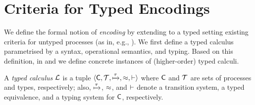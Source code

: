 \documentclass[runningheads]{llncs}
\begin{document}
{{\section{Criteria for Typed Encodings}
\label{s:expr}
%
We define the formal notion of \emph{encoding} by 
extending to a typed setting existing criteria for untyped processes (as in, e.g.,
\cite{Nestmann00,Palamidessi03,DBLP:conf/lics/PalamidessiSVV06,DBLP:journals/iandc/Gorla10,DBLP:conf/icalp/LanesePSS10,DBLP:journals/tcs/FuL10,DBLP:journals/corr/abs-1208-2750,DBLP:conf/esop/PetersNG13}). 
We first define a typed calculus parametrised by a syntax, operational semantics, and typing.
Based on this definition, in  
 and 
we define concrete instances of (higher-order) typed calculi.


\begin{definition}\label{d:tcalculus}%
	A \emph{typed calculus} $\mathcal{L}$ is a tuple
	$\langle \mathsf{C}, \cal{T}, \xmapsto{\tau}, \approx, \vdash \rangle$
	where $\mathsf{C}$ and $\cal{T}$ are sets of processes and types, 
	respectively; also, $\xmapsto{\tau}$, $\approx$, and $\vdash$ 
	denote a transition system, a typed equivalence,
	and a typing system for $\mathsf{C}$, respectively. 
\end{definition}

%
%
%
%

}}
\end{document}
